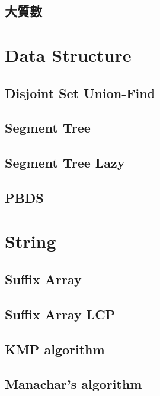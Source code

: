     \subsection{大質數}
        

\section{Data Structure}
    \subsection{Disjoint Set Union-Find}
        
    \subsection{Segment Tree}
        
    \subsection{Segment Tree Lazy}
        
    \subsection{PBDS}
        


\section{String}
    \subsection{Suffix Array}
        
    \subsection{Suffix Array LCP}
        
    \subsection{KMP algorithm}
        
    \subsection{Manachar's algorithm}
        
